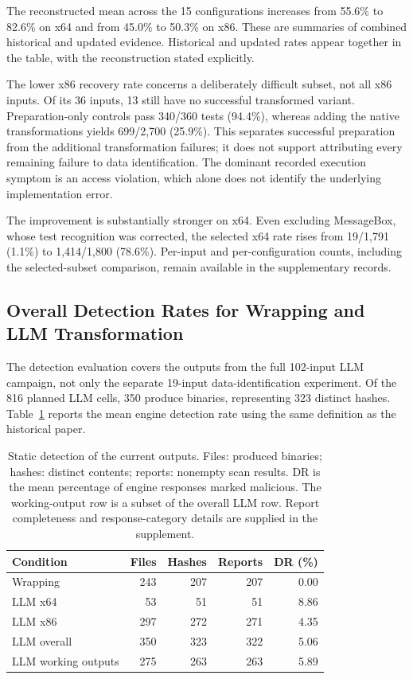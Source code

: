 The reconstructed mean across the 15 configurations increases from
55.6\% to 82.6\% on x64 and from 45.0\% to 50.3\% on x86.
These are summaries of combined historical and updated evidence. Historical and updated rates appear together in the table, with the
reconstruction stated explicitly.



The lower x86 recovery rate concerns a deliberately difficult subset,
not all x86 inputs. Of its 36 inputs, 13 still have no successful
transformed variant. Preparation-only controls pass 340/360 tests (94.4\%),
whereas adding the native transformations yields 699/2,700 (25.9\%).
This separates successful preparation from the additional transformation
failures; it does not support attributing every remaining failure to data
identification. The dominant recorded execution symptom is an access
violation, which alone does not identify the underlying implementation error.

The improvement is substantially stronger on x64. Even excluding
MessageBox, whose test recognition was corrected, the selected x64 rate
rises from 19/1,791 (1.1\%) to 1,414/1,800 (78.6\%). Per-input and
per-configuration counts, including the selected-subset comparison, remain
available in the supplementary records.

\subsection{Overall Detection Rates for Wrapping and LLM Transformation}
The detection evaluation covers the outputs from the full 102-input LLM
campaign, not only the separate 19-input data-identification experiment.
Of the 816 planned LLM cells, 350 produce binaries, representing 323
distinct hashes. Table~\ref{tab:current_scans} reports the mean engine
detection rate using the same definition as the historical paper.

\begin{table}[t]
\caption{Static detection of the current outputs. Files: produced binaries;
hashes: distinct contents; reports: nonempty scan results. DR is the mean
percentage of engine responses marked malicious.
The working-output row is a subset of the overall LLM row. Report
completeness and response-category details are supplied in the supplement.}
\label{tab:current_scans}
\centering\small\setlength{\tabcolsep}{6pt}
\begin{tabular}{@{}lrrrr@{}}
\toprule
Condition & Files & Hashes & Reports & DR (\%) \\
\midrule
Wrapping & 243 & 207 & 207 & 0.00 \\
LLM x64 & 53 & 51 & 51 & 8.86 \\
LLM x86 & 297 & 272 & 271 & 4.35 \\
\midrule
LLM overall & 350 & 323 & 322 & 5.06 \\
LLM working outputs & 275 & 263 & 263 & 5.89 \\
\bottomrule
\end{tabular}
\end{table}

